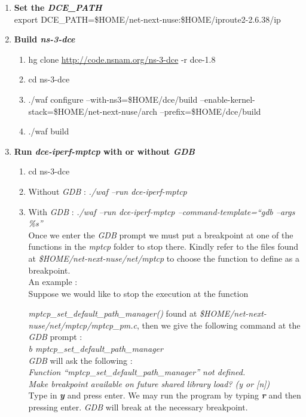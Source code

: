 \documentclass[a4paper,11pt]{article}
\begin{document}
\begin{enumerate}
\begin{enumerate}
				\end{enumerate}

			\item \textbf{Set the \emph{DCE\_PATH}} \\
				export DCE\_PATH=\$HOME/net-next-nuse:\$HOME/iproute2-2.6.38/ip

			\item \textbf{Build \emph{ns-3-dce }}
				\begin{enumerate}
				
					\item hg clone \url{http://code.nsnam.org/ns-3-dce}  -r dce-1.8
					\item cd ns-3-dce
					\item ./waf configure --with-ns3=\$HOME/dce/build --enable-kernel-stack=\$HOME/net-next-nuse/arch --prefix=\$HOME/dce/build
					\item ./waf build
				\end{enumerate}

			\item \textbf{Run \emph{dce-iperf-mptcp} with or without \emph{GDB}}
				\begin{enumerate}
					\item cd ns-3-dce
					\item Without \emph{GDB} : \emph{./waf --run dce-iperf-mptcp} \\
					\item With \emph{GDB} : \emph{./waf --run dce-iperf-mptcp --command-template=``gdb --args \%s''} \\
					Once we enter the \emph{GDB} prompt we must put a breakpoint at one of the functions in the \emph{mptcp} folder to stop there. Kindly refer to the files found at \emph{\$HOME/net-next-nuse/net/mptcp} to choose the function to define as a breakpoint. \\
					An example : \\
					Suppose we would like to stop the execution at the function \raggedright{\emph{mptcp\_set\_default\_path\_manager()}} found at \emph{\$HOME/net-next-nuse/net/mptcp/mptcp\_pm.c}, then we give the following command at the \emph{GDB} prompt : \\
					\emph{b mptcp\_set\_default\_path\_manager} \\
					\emph{GDB} will ask the following : \\
					\emph{Function ``mptcp\_set\_default\_path\_manager'' not defined.\\
					      Make breakpoint available on future shared library load? (y or [n])} \\
					Type in \textbf{\emph{y}} and press enter. We may run the program by typing \textbf{\emph{r}} and then pressing enter. \emph{GDB} will break at the necessary breakpoint. \\
				\end{enumerate}

		\end{enumerate}
\end{document}
